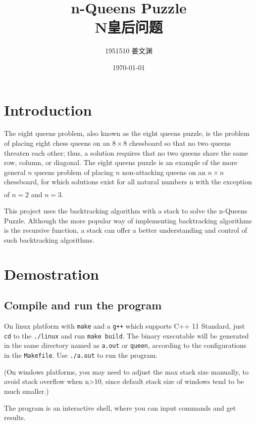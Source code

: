 \documentclass[cn,black,12pt,normal]{elegantnote}
\title{n-Queens Puzzle\\N皇后问题}
\author{1951510\; 姜文渊}
\institute{\small \url{https://github.com/jwyjohn/Jwy_DataStructureHomework}}
\date{\today}
\newcommand{\uct}[1]{\textsuperscript{\textsuperscript{\cite{#1}}}}
\begin{document}
\maketitle

\tableofcontents

\newpage

\section{Introduction}

The eight queens problem, also known as the eight queens puzzle, is the problem of placing eight chess queens on an $8 \times 8$ chessboard so that no two queens threaten each other; thus, a solution requires that no two queens share the same row, column, or diagonal. The eight queens puzzle is an example of the more general $n$ queens problem of placing $n$ non-attacking queens on an $n \times n$ chessboard, for which solutions exist for all natural numbers n with the exception of $n = 2$ and $n = 3$.\uct{wiki:Eight_queens_puzzle}

This project uses the backtracking algorithm with a stack to solve the n-Queens Puzzle. Although the more popular way of implementing backtracking algorithms is the recursive function, a stack can offer a better understanding and control of such backtracking algorithms.

\section{Demostration}

\subsection{Compile and run the program}

On linux platform with \lstinline{make} and a \lstinline{g++} which supports C++ 11 Standard, just \lstinline{cd} to the \lstinline{./linux} and run \lstinline{make build}. The binary executable will be generated in the same directory named as \lstinline{a.out} or \lstinline{queen}, according to the configurations in the \lstinline{Makefile}. Use \lstinline{./a.out} to run the program.

(On windows platforms, you may need to adjust the max stack size manually, to avoid stack overflow when n>10, since default stack size of windows tend to be much smaller.)

The program is an interactive shell, where you can input commands and get results.
\end{document}
